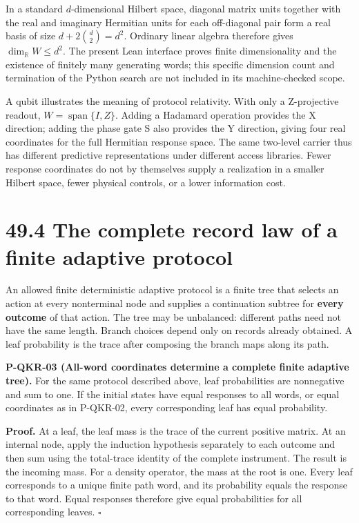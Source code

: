 \documentclass[
  11pt,
  oneside]{book}
\begin{document}
In a standard \(d\)-dimensional Hilbert space, diagonal matrix units
together with the real and imaginary Hermitian units for each
off-diagonal pair form a real basis of size \(d+2\binom d2=d^2\).
Ordinary linear algebra therefore gives \(\dim_{\mathbb R}W\le d^2\).
The present Lean interface proves finite dimensionality and the
existence of finitely many generating words; this specific dimension
count and termination of the Python search are not included in its
machine-checked scope.

A qubit illustrates the meaning of protocol relativity. With only a
Z-projective readout, \(W=\operatorname{span}\{I,Z\}\). Adding a
Hadamard operation provides the X direction; adding the phase gate S
also provides the Y direction, giving four real coordinates for the full
Hermitian response space. The same two-level carrier thus has different
predictive representations under different access libraries. Fewer
response coordinates do not by themselves supply a realization in a
smaller Hilbert space, fewer physical controls, or a lower information
cost.

\section{49.4 The complete record law of a finite adaptive protocol}

An allowed finite deterministic adaptive protocol is a finite tree that
selects an action at every nonterminal node and supplies a continuation
subtree for \textbf{every outcome} of that action. The tree may be
unbalanced: different paths need not have the same length. Branch
choices depend only on records already obtained. A leaf probability is
the trace after composing the branch maps along its path.

\label{p-qkr-03}{}

\textbf{P-QKR-03 (All-word coordinates determine a complete finite
adaptive tree).} For the same protocol described above, leaf
probabilities are nonnegative and sum to one. If the initial states have
equal responses to all words, or equal coordinates as in P-QKR-02, every
corresponding leaf has equal probability.

\textbf{Proof.} At a leaf, the leaf mass is the trace of the current
positive matrix. At an internal node, apply the induction hypothesis
separately to each outcome and then sum using the total-trace identity
of the complete instrument. The result is the incoming mass. For a
density operator, the mass at the root is one. Every leaf corresponds to
a unique finite path word, and its probability equals the response to
that word. Equal responses therefore give equal probabilities for all
corresponding leaves. \(\square\)
\end{document}
